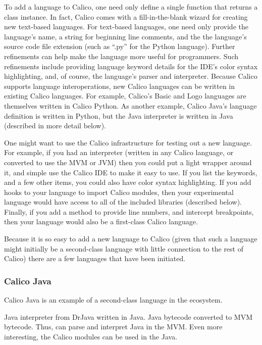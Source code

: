 \documentclass[preprint]{sigplanconf}
\begin{document}
To add a language to Calico, one need only define a single function
that returns a class instance. In fact, Calico comes with a
fill-in-the-blank wizard for creating new text-based languages. For
text-based languages, one need only provide the language's name, a
string for beginning line comments, and the the language's source code
file extension (such as ``.py'' for the Python language). Further
refinements can help make the language more useful for
programmers. Such refinements include providing language keyword
details for the IDE's color syntax highlighting, and, of course, the
language's parser and interpreter. Because Calico supports language
interoperations, new Calico languages can be written in existing
Calico languages. For example, Calico's Basic and Logo languages are
themselves written in Calico Python. As another example, Calico Java's
language definition is written in Python, but the Java interpreter is
written in Java (described in more detail below).

One might want to use the Calico infrastructure for testing out a new
language. For example, if you had an interpreter (written in any
Calico language, or converted to use the MVM or JVM) then you could
put a light wrapper around it, and simple use the Calico IDE to make
it easy to use. If you list the keywords, and a few other items, you
could also have color syntax highlighting. If you add hooks to your
language to import Calico modules, then your experimental language
would have access to all of the included libraries (described
below). Finally, if you add a method to provide line numbers, and
intercept breakpoints, then your language would also be a first-class
Calico language.

Because it is so easy to add a new language to Calico (given that such
a language might initially be a second-class language with little
connection to the rest of Calico) there are a few languages that have
been initiated.

\subsubsection{Calico Java}

Calico Java is an example of a second-class language in the ecosystem.

Java interpreter from DrJava written in Java. Java bytecode converted
to MVM bytecode. Thus, can parse and interpret Java in the MVM. Even
more interesting, the Calico modules can be used in the Java.
\end{document}
